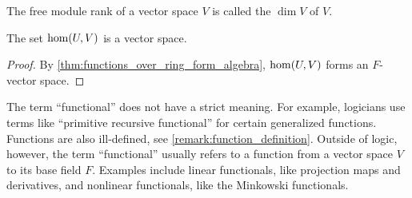 \begin{definition}\label{def:vector_space_dimension}
  The free module rank of a vector space \( V \) is called the  \( \dim V \) of \( V \).
\end{definition}

\begin{proposition}\label{thm:linear_maps_form_algebra}
  The set \( \operatorname{hom}(U, V) \) is a vector space.
\end{proposition}
\begin{proof}
  By \cref{thm:functions_over_ring_form_algebra}, \( \operatorname{hom}(U, V) \) forms an \( F \)-vector space.
\end{proof}

\begin{remark}\label{remark:functional}
  The term \enquote{functional} does not have a strict meaning. For example, logicians use terms like \enquote{primitive recursive functional} for certain generalized functions. Functions are also ill-defined, see \cref{remark:function_definition}. Outside of logic, however, the term \enquote{functional} usually refers to a function from a vector space \( V \) to its base field \( F \). Examples include linear functionals, like projection maps and derivatives, and nonlinear functionals, like the Minkowski functionals.
\end{remark}
